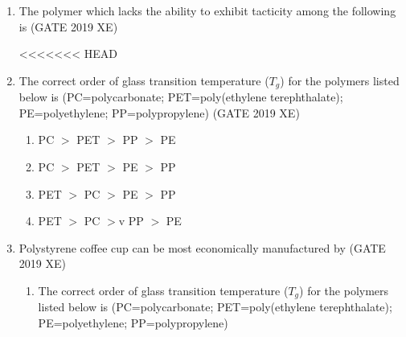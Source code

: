 \documentclass[journal,12pt,onecolumn]{IEEEtran}
\begin{document}
\begin{enumerate}
\item The polymer which lacks the ability to exhibit tacticity among the following is
\hfill{(GATE 2019 XE)} \\
\begin{multicols}{2}
<<<<<<< HEAD
\end{multicols}

\item The correct order of glass transition temperature ($T_g$) for the polymers listed below is (PC=polycarbonate; PET=poly(ethylene terephthalate); PE=polyethylene; PP=polypropylene)
\hfill{(GATE 2019 XE)} \\
\begin{multicols}{2}
\begin{enumerate}
\item PC $>$ PET $>$ PP $>$ PE
\item PC $>$ PET $>$ PE $>$ PP
\item PET $>$ PC $>$ PE $>$ PP
\item PET $>$ PC $>$v PP $>$ PE
\end{enumerate}
\end{multicols}

\item Polystyrene coffee cup can be most economically manufactured by
\hfill{(GATE 2019 XE)} \\
\begin{multicols}{2}
\begin{enumerate}
=======

\vspace{0.5cm}

\item The correct order of glass transition temperature ($T_g$) for the polymers listed below is (PC=polycarbonate; PET=poly(ethylene terephthalate); PE=polyethylene; PP=polypropylene)
\hfill{} \\


\end{enumerate}
\end{multicols}
\end{enumerate}
\end{document}
